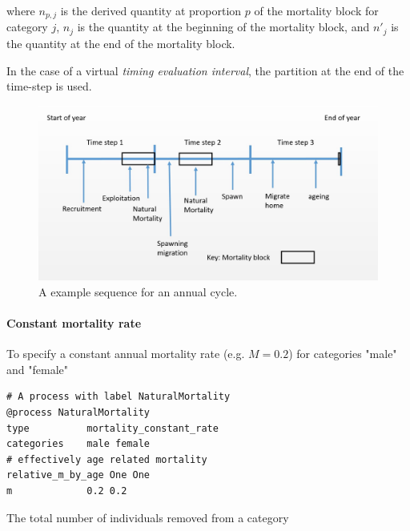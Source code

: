 where $n_{p,j}$ is the derived quantity at proportion $p$ of the mortality block for category $j$, $n_j$ is the quantity at the beginning of the mortality block, and $n'_j$ is the quantity at the end of the mortality block.

In the case of a virtual \textit{timing evaluation interval}, the partition at the end of the time-step is used.


\begin{figure}[H]
	\centering
	\includegraphics[scale=0.5]{Figures/annual_cycle.jpg}
	\caption{A example sequence for an annual cycle.}\label{Fig:annual2}
\end{figure}



\paragraph{Constant mortality rate}\label{sec:Process-MortalityConstantRate} 

To specify a constant annual mortality rate (e.g. $M=0.2$) for categories "male" and "female"

{\small{\begin{verbatim}
# A process with label NaturalMortality
@process NaturalMortality
type          mortality_constant_rate
categories    male female
# effectively age related mortality
relative_m_by_age One One
m             0.2 0.2
\end{verbatim}}}

The total number of individuals removed from a category

